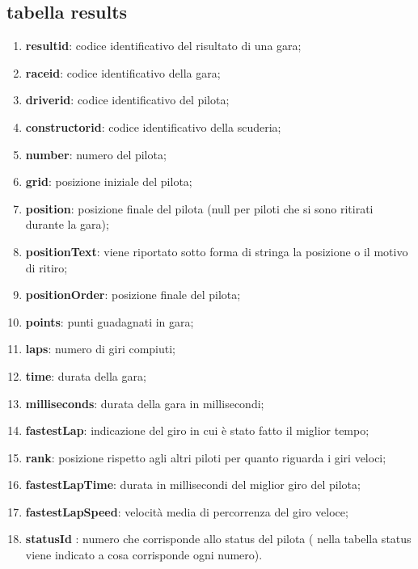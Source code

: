 \subsection{tabella results}%
\begin{enumerate}
    \item \textbf{resultid}: codice identificativo del risultato di una gara;
    \item \textbf{raceid}: codice identificativo della gara;
    \item \textbf{driverid}: codice identificativo del pilota;
    \item \textbf{constructorid}: codice identificativo della scuderia;
    \item \textbf{number}: numero del pilota;
    \item \textbf{grid}: posizione iniziale del pilota;
    \item \textbf{position}: posizione finale del pilota (null per piloti che si sono ritirati durante la gara);
    \item \textbf{positionText}: viene riportato sotto forma di stringa la posizione o il motivo di ritiro;
    \item \textbf{positionOrder}: posizione finale del pilota;
    \item \textbf{points}: punti guadagnati in gara;
    \item \textbf{laps}: numero di giri compiuti;
    \item \textbf{time}: durata della gara;
    \item \textbf{milliseconds}: durata della gara in millisecondi;
    \item \textbf{fastestLap}: indicazione del giro in cui è stato fatto il miglior tempo;
    \item \textbf{rank}: posizione rispetto agli altri piloti per quanto riguarda i giri veloci;
    \item \textbf{fastestLapTime}: durata in millisecondi del miglior giro del pilota;
    \item \textbf{fastestLapSpeed}: velocità media di percorrenza del giro veloce;
    \item \textbf{statusId} : numero che corrisponde allo status del pilota ( nella tabella status viene indicato a cosa corrisponde ogni numero).
\end{enumerate}
